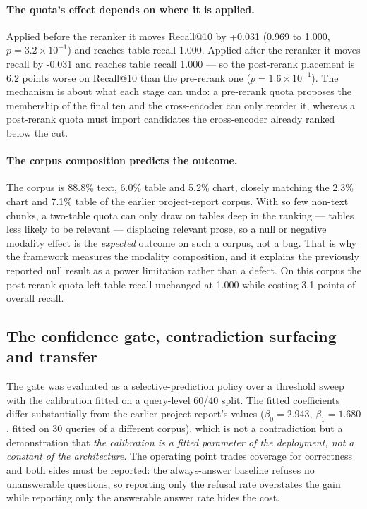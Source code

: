 \documentclass[conference]{IEEEtran}
\begin{document}
\paragraph{The quota's effect depends on where it is applied.} Applied before the reranker it moves Recall@10 by +0.031 (0.969 to 1.000, $p=3.2\!\times\!10^{-1}$) and reaches table recall 1.000. Applied after the reranker it moves recall by -0.031 and reaches table recall 1.000 --- so the post-rerank placement is 6.2 points worse on Recall@10 than the pre-rerank one ($p=1.6\!\times\!10^{-1}$). The mechanism is about what each stage can undo: a pre-rerank quota proposes the membership of the final ten and the cross-encoder can only reorder it, whereas a post-rerank quota must import candidates the cross-encoder already ranked below the cut.


\paragraph{The corpus composition predicts the outcome.} The corpus is
88.8\% text, 6.0\% table and
5.2\% chart, closely matching the 2.3\% chart and 7.1\%
table of the earlier project-report corpus. With so few non-text chunks, a
two-table quota can only draw on tables deep in the ranking --- tables less
likely to be relevant --- displacing relevant prose, so a null or negative
modality effect is the \emph{expected} outcome on such a corpus, not a bug.
That is why the framework measures the modality composition, and it explains
the previously reported null result as a power limitation rather than a
defect. On this corpus the post-rerank quota left table recall unchanged at 1.000 while costing
3.1 points of overall recall.

\subsection{The confidence gate, contradiction surfacing and transfer}
The gate was evaluated as a selective-prediction policy over a threshold
sweep with the calibration fitted on a query-level 60/40 split. The fitted
coefficients differ substantially from the earlier project report's values
($\beta_0=2.943$, $\beta_1=1.680$, fitted on 30 queries of a different
corpus), which is not a contradiction but a demonstration that \emph{the
calibration is a fitted parameter of the deployment, not a constant of the
architecture}. The operating point trades coverage for correctness and both
sides must be reported: the always-answer baseline refuses no unanswerable
questions, so reporting only the refusal rate overstates the gain while
reporting only the answerable answer rate hides the cost.
\end{document}
